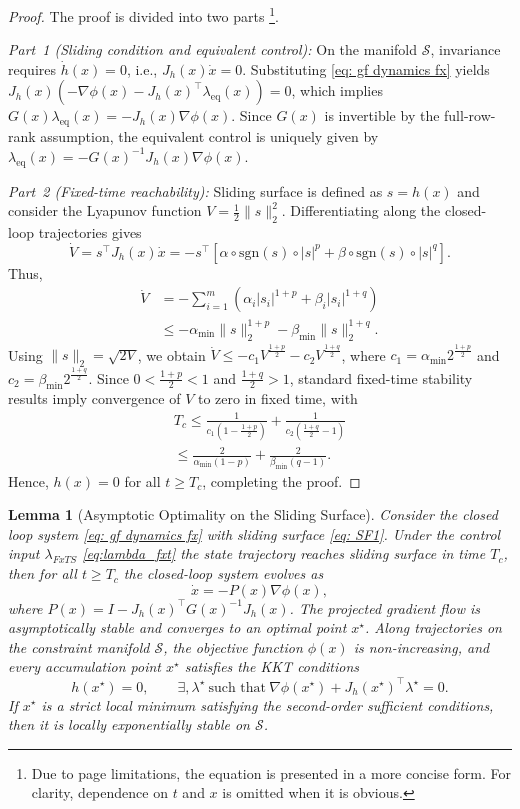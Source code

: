 \documentclass[letterpaper, 10 pt, conference]{ieeeconf}
\newtheorem{lemma}{Lemma}\let\labelindent\relax
\begin{document}
\begin{proof}
The proof is divided into two parts \footnote{Due to page limitations, the equation is presented in a more concise form. For clarity, dependence on $t$ and $x$ is omitted when it is obvious.}.

\emph{Part~1 (Sliding condition and equivalent control): }
On the manifold $\mathcal{S}$, invariance requires $\dot{h}(x)=0$, i.e., $J_h(x)\dot{x}=0.$
Substituting \eqref{eq: gf dynamics fx} yields
$J_h(x)\left(-\nabla \phi(x)-J_h(x)^\top\lambda_{\mathrm{eq}}(x)\right)=0$,
which implies $G(x)\lambda_{\mathrm{eq}}(x)=-J_h(x)\nabla \phi(x)$.
Since $G(x)$ is invertible by the full-row-rank assumption, the equivalent
control is uniquely given by $\lambda_{\mathrm{eq}}(x)=-G(x)^{-1}J_h(x)\nabla \phi(x)$.

\emph{Part~2 (Fixed-time reachability): }
Sliding surface is defined as $s=h(x)$ and consider the Lyapunov function $V=\frac12\|s\|_2^2$.
Differentiating along the closed-loop trajectories gives
\[
\dot{V}
= s^\top J_h(x)\dot{x}
= -s^\top\!\left[
\alpha \circ \mathrm{sgn}(s)\! \circ \! |s|^{p}
+ \beta \circ \mathrm{sgn}(s)\! \circ \! |s|^{q}
\right].
\]
Thus, 
\begin{align*}
    \dot{V}&= -\sum_{i=1}^m(\alpha_i |s_i|^{1+p}+ \beta_i |s_i|^{1+q}) \\
    &\le -\alpha_{\min}\|s\|_2^{1+p}-\beta_{\min}\|s\|_2^{1+q}.
\end{align*}
Using $\|s\|_2=\sqrt{2V}$, we obtain $\dot{V} \le -c_1 V^{\frac{1+p}{2}} - c_2 V^{\frac{1+q}{2}}$, where $c_1=\alpha_{\min}2^{\frac{1+p}{2}}$ and $c_2=\beta_{\min}2^{\frac{1+q}{2}}$.
Since $0<\frac{1+p}{2}<1$ and $\frac{1+q}{2}>1$, standard fixed-time
stability results imply convergence of $V$ to zero in fixed time, with
\begin{align}
 T_c \le \!\!\frac{1}{c_1\!\left(1-\frac{1+p}{2}\right)}
     +\!\frac{1}{c_2\!\left(\frac{1+q}{2}-1\right)} \nonumber\\
\le \!\frac{2}{\alpha_{\min}(1-p)} +\! \frac{2}{\beta_{\min}(q-1)}. \nonumber  
\end{align}
Hence, $h(x)=0$ for all $t\ge T_c$, completing the proof.
\end{proof}
\begin{lemma}[Asymptotic Optimality on the Sliding Surface]
Consider the closed loop system \eqref{eq: gf dynamics fx} with sliding surface \eqref{eq: SF1}.
Under the control input $\lambda_{FxTS}$ \eqref{eq:lambda_fxt} the state trajectory reaches sliding surface  in time $T_c$, then for all $t\ge T_c$ the closed-loop system evolves as
\[
\dot{x}=-P(x)\nabla \phi(x),
\]
where $P(x)=I-J_h(x)^\top G(x)^{-1}J_h(x)$. The projected gradient flow is asymptotically stable and converges to an optimal point $x^\star$. Along trajectories on the constraint manifold $\mathcal{S}$, the objective function $\phi(x)$ is non-increasing, and every accumulation point $x^\star$ satisfies the KKT conditions
\[
h(x^\star)=0,\qquad \exists,\lambda^\star \ \text{such that}\ \nabla \phi(x^\star)+J_h(x^\star)^\top\lambda^\star=0.
\]
If $x^ \star$ is a strict local minimum satisfying the second-order sufficient conditions, then it is locally exponentially stable on $\mathcal{S}$.
\end{lemma}
\end{document}
